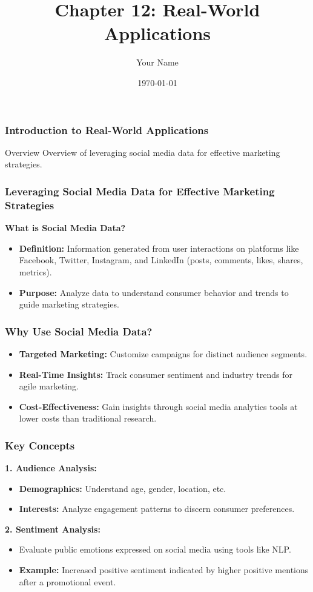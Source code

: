 \documentclass{beamer}
\title{Chapter 12: Real-World Applications}
\author{Your Name}
\institute{Your Institution}
\date{\today}
\begin{document}
\frame{\titlepage}

\begin{frame}[fragile]
    \frametitle{Introduction to Real-World Applications}
    \begin{block}{Overview}
        Overview of leveraging social media data for effective marketing strategies.
    \end{block}
\end{frame}

\begin{frame}[fragile]
    \frametitle{Leveraging Social Media Data for Effective Marketing Strategies}
    \textbf{What is Social Media Data?}
    \begin{itemize}
        \item \textbf{Definition:} Information generated from user interactions on platforms like Facebook, Twitter, Instagram, and LinkedIn (posts, comments, likes, shares, metrics).
        \item \textbf{Purpose:} Analyze data to understand consumer behavior and trends to guide marketing strategies.
    \end{itemize}
\end{frame}

\begin{frame}[fragile]
    \frametitle{Why Use Social Media Data?}
    \begin{itemize}
        \item \textbf{Targeted Marketing:} Customize campaigns for distinct audience segments.
        \item \textbf{Real-Time Insights:} Track consumer sentiment and industry trends for agile marketing.
        \item \textbf{Cost-Effectiveness:} Gain insights through social media analytics tools at lower costs than traditional research.
    \end{itemize}
\end{frame}

\begin{frame}[fragile]
    \frametitle{Key Concepts}
    \textbf{1. Audience Analysis:}
    \begin{itemize}
        \item \textbf{Demographics:} Understand age, gender, location, etc.
        \item \textbf{Interests:} Analyze engagement patterns to discern consumer preferences.
    \end{itemize}

    \textbf{2. Sentiment Analysis:}
    \begin{itemize}
        \item Evaluate public emotions expressed on social media using tools like NLP.
        \item \textbf{Example:} Increased positive sentiment indicated by higher positive mentions after a promotional event.
    \end{itemize}
\end{frame}
\end{document}
